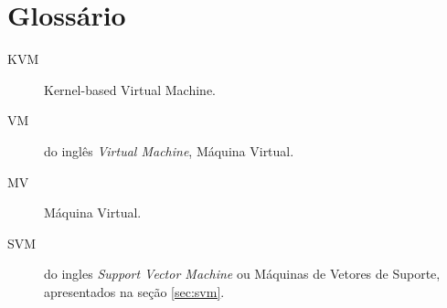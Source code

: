 %
%
\chapter{Glossário}

\begin{description}
\item[KVM] Kernel-based Virtual Machine.
\item[VM] do inglês \emph{Virtual Machine}, Máquina Virtual.
\item[MV] Máquina Virtual.
\item[SVM] do ingles \emph{Support Vector Machine} ou Máquinas de Vetores
de Suporte, apresentados na seção \ref{sec:svm}.
\end{description}
